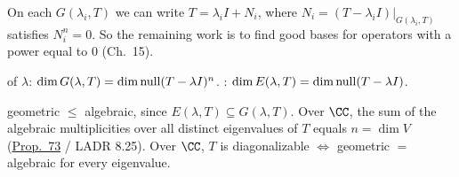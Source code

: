 \documentclass[10pt]{scrartcl}
\begin{document}
On each $G(\lambda_i,T)$ we can write $T=\lambda_iI+N_i$, where $N_i=(T-\lambda_iI)|_{G(\lambda_i,T)}$ satisfies $N_i^n=0$. So the remaining work is to find good bases for operators with a power equal to $0$ (Ch.~15).

\begin{definition*}\hypertarget{def-38}{}\label{def-38}
   of $\lambda$: $\dim G(\lambda,T)=\dim\operatorname{null}(T-\lambda I)^n$. : $\dim E(\lambda,T)=\dim\operatorname{null}(T-\lambda I)$.
\end{definition*}
\begin{itemize}
  \ii geometric $\le$ algebraic, since $E(\lambda,T)\subseteq G(\lambda,T)$.
  \ii Over $\CC$, the sum of the algebraic multiplicities over all distinct eigenvalues of $T$ equals $n=\dim V$ (\hyperref[prop-73]{Prop.~73} / LADR 8.25).
  \ii Over $\CC$, $T$ is diagonalizable $\iff$ geometric $=$ algebraic for every eigenvalue.
\end{itemize}
\end{document}
